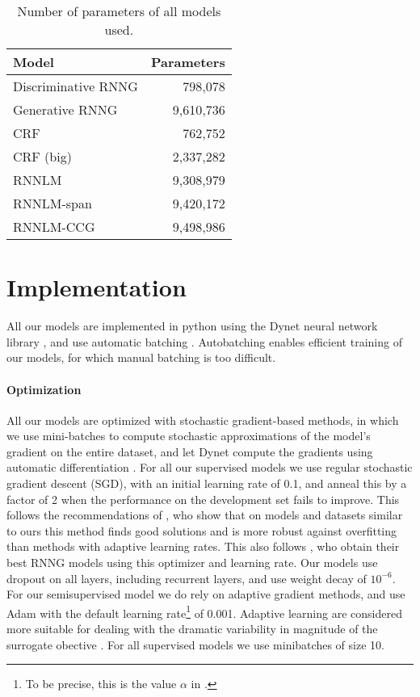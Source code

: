     \begin{table}[h]
    \center
      \begin{tabular}{l|r}
          Model  & Parameters \\ \hline
          Discriminative RNNG & 798,078  \\
          Generative RNNG & 9,610,736  \\
          CRF & 762,752  \\
          CRF (big) & 2,337,282  \\
          RNNLM & 9,308,979 \\
          RNNLM-span & 9,420,172 \\
          RNNLM-CCG & 9,498,986
      \end{tabular}
      \caption{Number of parameters of all models used.}
      \label{tab:num-params}
    \end{table}


\section{Implementation}
  All our models are implemented in python using the Dynet neural network library \citep{neubig2017dynet}, and use automatic batching \citep{neubig2017fly}. Autobatching enables efficient training of our models, for which manual batching is too difficult.

  \paragraph{Optimization}
    All our models are optimized with stochastic gradient-based methods, in which we use mini-batches to compute stochastic approximations of the model's gradient on the entire dataset, and let Dynet compute the gradients using automatic differentiation \citep{neubig2017dynet,baydin2018automatic}. For all our supervised models we use regular stochastic gradient descent (SGD), with an initial learning rate of 0.1, and anneal this by a factor of 2 when the performance on the development set fails to improve. This follows the recommendations of \citet{wilson2017marginal}, who show that on models and datasets similar to ours this method finds good solutions and is more robust against overfitting than methods with adaptive learning rates. This also follows \citet{dyer2016rnng}, who obtain their best RNNG models using this optimizer and learning rate. Our models use dropout on all layers, including recurrent layers, and use weight decay of $10^{-6}$. For our semisupervised model we do rely on adaptive gradient methods, and use Adam \citep{kingma2014adam} with the default learning rate\footnote{To be precise, this is the value $\alpha$ in \citet{kingma2014adam}.} of 0.001. Adaptive learning are considered more suitable for dealing with the dramatic variability in magnitude of the surrogate obective \citep{ranganath2014black,klein2018reinforce}. For all supervised models we use minibatches of size 10.

